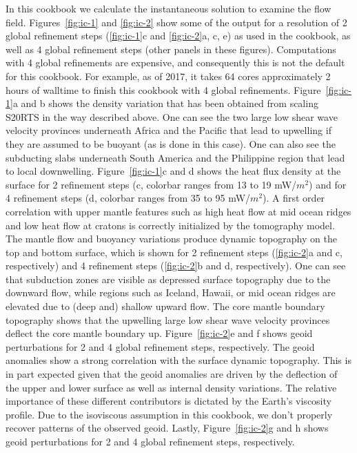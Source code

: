 \documentclass{article}
\begin{document}
In this cookbook we calculate the instantaneous solution to examine the flow 
field. Figures~\ref{fig:ic-1} and \ref{fig:ic-2} show some of the output 
for a resolution of 2 global refinement steps (\ref{fig:ic-1}c and 
\ref{fig:ic-2}a, c, e) as used in the cookbook, as well as 4 global 
refinement steps (other panels in these figures). Computations with 4 global 
refinements are expensive, and consequently this is not the 
default for this cookbook. For example, as of 2017, it takes 64 cores approximately
2 hours of walltime to finish this cookbook with 4 global refinements. 
Figure~\ref{fig:ic-1}a and b shows the density variation 
that has been obtained from scaling S20RTS in the way described above.
One can see the two large low shear wave velocity provinces
underneath Africa and the Pacific that lead to upwelling if they are assumed to 
be buoyant (as is done in this case). One can also see the subducting slabs 
underneath South America and the Philippine region that lead to local downwelling. 
Figure~\ref{fig:ic-1}c and d shows the heat flux density at the surface for 
2 refinement steps (c, colorbar ranges from 13 to 19 mW/$m^2$) and for 
4 refinement steps (d, colorbar ranges from 35 to 95 mW/$m^2$). A first order correlation
with upper mantle features such as high heat flow at mid ocean ridges and low
heat flow at cratons is correctly initialized by the tomography model. 
The mantle flow and buoyancy variations produce dynamic topography on the 
top and bottom surface, which is shown for 2 refinement steps (\ref{fig:ic-2}a and c, respectively) 
and 4 refinement steps (\ref{fig:ic-2}b and d, respectively). 
One can see that subduction zones are visible as depressed surface topography 
due to the downward flow, while regions such as Iceland, Hawaii, or mid ocean 
ridges are elevated due to (deep and) shallow upward flow. The core mantle boundary
topography shows that the upwelling large low shear wave velocity 
provinces deflect the core mantle boundary up. Figure~\ref{fig:ic-2}e and 
f shows geoid perturbations for 2 and 4 global refinement steps, respectively. 
The geoid anomalies show a strong correlation with the surface dynamic topography. 
This is in part expected given that the geoid anomalies are driven by the 
deflection of the upper and lower surface
as well as internal density variations. The relative importance of these different
contributors is dictated by the Earth's viscosity profile. Due to the isoviscous
assumption in this cookbook, we don't properly recover patterns of the observed
geoid. Lastly, Figure~\ref{fig:ic-2}g and h shows geoid perturbations for 2 and 4 
global refinement steps, respectively.
\end{document}
